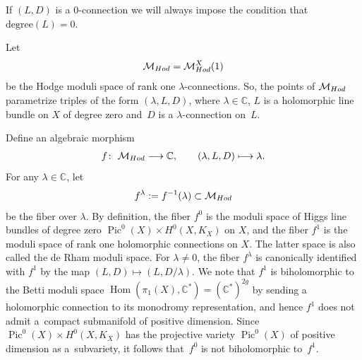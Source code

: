 \documentclass[11pt]{article}
\numberwithin{equation}{section}
\begin{document}
If $(L, D)$ is a $0$-connection we will always impose the condition that $\text{degree}(L) = 0$.

Let
\begin{gather*}
{\mathcal M}_{\rm Hod} = {\mathcal M}^X_{\rm Hod}(1)
\end{gather*}
be the Hodge moduli space of rank one $\lambda$-connections. So, the points of ${\mathcal M}_{\rm Hod}$ parametrize triples of the form $(\lambda, L, D)$, where $\lambda \in \mathbb C$, $L$ is a holomorphic line bundle on $X$ of degree zero and~$D$ is a $\lambda$-connection on~$L$.

Def\/ine an algebraic morphism
\begin{gather}\label{lf}
f \colon \ {\mathcal M}_{\rm Hod} \longrightarrow {\mathbb C} , \qquad (\lambda, L, D) \longmapsto \lambda .
\end{gather}
For any $\lambda \in \mathbb C$, let
\begin{gather*}%
f^\lambda := f^{-1}(\lambda) \subset {\mathcal M}_{\rm Hod}
\end{gather*}
be the f\/iber over $\lambda$. By def\/inition, the f\/iber $f^0$ is the moduli space of Higgs line bundles of degree zero $\operatorname{Pic}^0(X)\times H^0(X, K_X)$ on $X$, and the f\/iber $f^1$ is the moduli space of rank one holomorphic connections on $X$. The latter space is also called the de Rham moduli space. For $\lambda \not= 0$, the f\/iber $f^\lambda$ is canonically identif\/ied with $f^1$ by the map $(L, D) \longmapsto (L, D/\lambda)$. We note that $f^1$ is biholomorphic to the Betti moduli space $\operatorname{Hom}(\pi_1(X), {\mathbb C}^*) = ({\mathbb C}^*)^{2g}$ by sending a holomorphic connection to its monodromy representation, and hence $f^1$ does not admit a~compact submanifold of positive dimension. Since $\operatorname{Pic}^0(X)\times H^0(X, K_X)$ has the projective variety $\operatorname{Pic}^0(X)$ of positive dimension as a~subvariety, it follows that~$f^0$ is not biholomorphic to~$f^1$.
\end{document}
